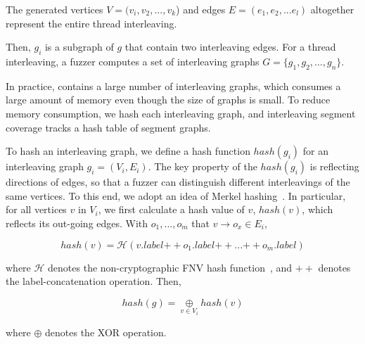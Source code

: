 %
The generated vertices $V = (v_i, v_2, ..., v_k$) and edges
$E = (e_1, e_2, ... e_l)$ altogether represent the entire thread
interleaving.



Then, $g_i$ is a subgraph of $g$ that contain two interleaving edges.
%
For a thread interleaving, a fuzzer computes a set of interleaving
graphs $G = \{g_1, g_2, ..., g_n\}$.







In practice, \intcov contains a large number of interleaving graphs,
which consumes a large amount of memory even though the size of graphs
is small.
%
To reduce memory consumption, we hash each interleaving graph,
and interleaving segment coverage tracks a hash table of segment
graphs.



To hash an interleaving graph, we define a hash function $hash(g_i)$
for an interleaving graph $g_i = (V_i, E_i)$.
%
The key property of the $hash(g_i)$ is reflecting directions of edges,
so that a fuzzer can distinguish different interleavings of the same
vertices.
%
To this end, we adopt an idea of Merkel hashing~\cite{treehashing,
  treehashing2}.
%
In particular, for all vertices $v$ in $V_i$, we first calculate a
hash value of $v$, $hash(v)$, which reflects its out-going edges. With
$o_1, ..., o_m$ that $v \rightarrow o_x \in E_i$,
%

\[ hash(v) = \mathcal{H}(v.label {++} o_1.label {++} ... {++}
  o_m.label) \]

where $\mathcal{H}$ denotes the
non-cryptographic FNV hash function~\cite{fnv, fnv-go}, and ${++}$
denotes the label-concatenation operation.
%
Then,

\[
  hash(g) = \underset{v \in V_i}{\oplus} hash(v)
\]

where $\oplus$ denotes the XOR operation.






